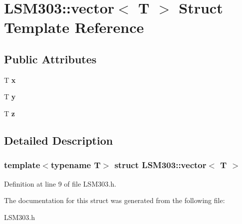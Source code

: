 \hypertarget{struct_l_s_m303_1_1vector}{}\section{L\+S\+M303\+:\+:vector$<$ T $>$ Struct Template Reference}
\label{struct_l_s_m303_1_1vector}
\subsection*{Public Attributes}
\begin{DoxyCompactItemize}
\item 
\mbox{\label{struct_l_s_m303_1_1vector_a2c9ffb6ff5fbbc0af80d668b64dafddc}} 
T {\bfseries x}
\item 
\mbox{\label{struct_l_s_m303_1_1vector_aa41267336da17875f8a5eea92f6b46de}} 
T {\bfseries y}
\item 
\mbox{\label{struct_l_s_m303_1_1vector_ad6cc8ae7b64534599bd7d34492ae2bcc}} 
T {\bfseries z}
\end{DoxyCompactItemize}


\subsection{Detailed Description}
\subsubsection*{template$<$typename T$>$\newline
struct L\+S\+M303\+::vector$<$ T $>$}



Definition at line 9 of file L\+S\+M303.\+h.



The documentation for this struct was generated from the following file\+:\begin{DoxyCompactItemize}
\item 
L\+S\+M303.\+h\end{DoxyCompactItemize}
